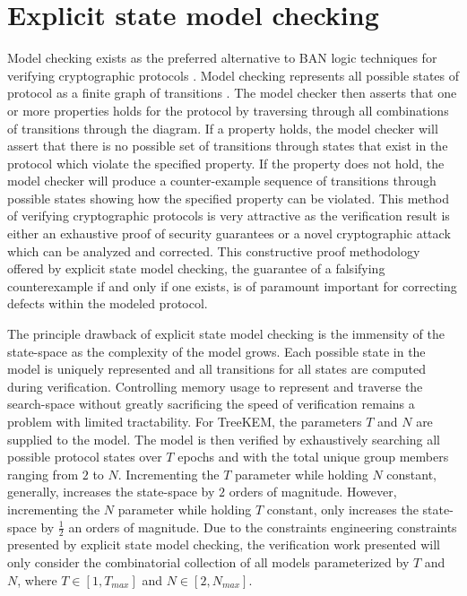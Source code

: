 \hypertarget{explicit-state-model-checking}{%
\section{Explicit state model checking}\label{explicit-state-model-checking}}

Model checking exists as the preferred alternative to BAN logic techniques for verifying cryptographic protocols \autocite{kacprzak2006comparing} \autocite{lomuscio2007verification} \autocite{van2004symbolic}.
Model checking represents all possible states of protocol as a finite graph of transitions \autocite{clarke1981design}.
The model checker then asserts that one or more properties holds for the protocol by traversing through all combinations of transitions through the diagram.
If a property holds, the model checker will assert that there is no possible set of transitions through states that exist in the protocol which violate the specified property.
If the property does not hold, the model checker will produce a counter-example sequence of transitions through possible states showing how the specified property can be violated.
This method of verifying cryptographic protocols is very attractive as the verification result is either an exhaustive proof of security guarantees or a novel cryptographic attack which can be analyzed and corrected.
This constructive proof methodology offered by explicit state model checking, the guarantee of a falsifying counterexample if and only if one exists, is of paramount important for correcting defects within the modeled protocol.

The principle drawback of explicit state model checking is the immensity of the state-space as the complexity of the model grows.
Each possible state in the model is uniquely represented and all transitions for all states are computed during verification.
Controlling memory usage to represent and traverse the search-space without greatly sacrificing the speed of verification remains a problem with limited tractability.
For TreeKEM, the parameters \(T\) and \(N\) are supplied to the model.
The model is then verified by exhaustively searching all possible protocol states over \(T\) epochs and with the total unique group members ranging from \(2\) to \(N\).
Incrementing the \(T\) parameter while holding \(N\) constant, generally, increases the state-space by \(2\) orders of magnitude.
However, incrementing the \(N\) parameter while holding \(T\) constant, only increases the state-space by \(\frac{1}{2}\) an orders of magnitude.
Due to the constraints engineering constraints presented by explicit state model checking, the verification work presented will only consider the combinatorial collection of all models parameterized by \(T\) and \(N\), where \(T \in [1, T_{max}]\) and \(N \in [2, N_{max}]\).


